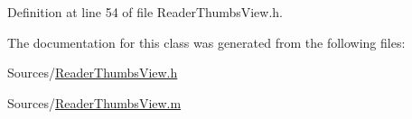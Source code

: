 Definition at line 54 of file Reader\-Thumbs\-View.\-h.



The documentation for this class was generated from the following files\-:\begin{DoxyCompactItemize}
\item 
Sources/\hyperlink{_reader_thumbs_view_8h}{Reader\-Thumbs\-View.\-h}\item 
Sources/\hyperlink{_reader_thumbs_view_8m}{Reader\-Thumbs\-View.\-m}\end{DoxyCompactItemize}
